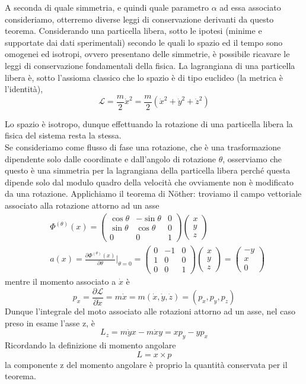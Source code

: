 \documentclass[
10pt, %
a4paper, %
oneside, %
headinclude,footinclude, %
BCOR5mm, %
]{scrartcl}
\begin{document}
A seconda di quale simmetria, e quindi quale parametro $\alpha$ ad essa associato consideriamo, otterremo diverse leggi di conservazione derivanti da questo teorema. Considerando una particella libera, sotto le ipotesi (minime e supportate dai dati sperimentali) secondo le quali lo spazio ed il tempo sono omogenei ed isotropi, ovvero presentano delle simmetrie, è possibile ricavare le leggi di conservazione fondamentali della fisica. La lagrangiana di una particella libera è, sotto l'assioma classico che lo spazio è di tipo euclideo (la metrica è l'identità),  
\[\mathcal{L} = \frac{m}{2}\dot{x}^2=\frac{m}{2}(\dot{x}^2+\dot{y}^2+\dot{z}^2)\]
\begin{esempio}
	Lo spazio è isotropo, dunque effettuando la rotazione di una particella libera la fisica del sistema resta la stessa.\\
	Se consideriamo come flusso di fase una rotazione, che è una trasformazione dipendente solo dalle coordinate e dall'angolo di rotazione $\theta$, osserviamo che questo è una simmetria per la lagrangiana della particella libera perché questa dipende solo dal modulo quadro della velocità che ovviamente non è modificato da una rotazione. Applichiamo il teorema di N\"{o}ther: troviamo il campo vettoriale associato alla rotazione attorno ad un asse 
	\begin{align*}
		&\Phi^{(\theta)}(x)= 
		\begin{pmatrix}
			\cos\theta& -\sin\theta & 0\\
			\sin\theta&  \cos\theta & 0\\
			0         &  0          & 1
		\end{pmatrix}
		\begin{pmatrix}
			x\\
			y\\
			z
		\end{pmatrix}
		\\
		&a(x) = \frac{\partial \Phi^{(\theta)}(x)}{\partial \theta}|_{\theta = 0}= 
		\begin{pmatrix}
			0& -1 & 0\\
			1&  0 & 0\\
			0&  0 & 1
		\end{pmatrix}
		\begin{pmatrix}
			x\\
			y\\
			z
		\end{pmatrix}=
		\begin{pmatrix}
			-y\\
			x\\
			0
		\end{pmatrix}	 
	\end{align*}
	mentre il momento associato a $\dot{x}$ è
	\[p_x = \frac{\partial \mathcal{L}}{\partial \dot{x}} = m \dot{x} = m (\dot{x}, \dot{y}, \dot{z})=(p_x, p_y,p_z)\]
	Dunque l'integrale del moto associato alle rotazioni attorno ad un asse, nel caso preso in esame l'asse z, è
	\[L_z = m\dot{y}x-m\dot{x}y = xp_y-yp_x\]
	Ricordando la definizione di momento angolare
	\[L = x\times p\]
	la componente z del momento angolare è proprio la quantità conservata per il teorema.
\end{esempio}
\end{document}
